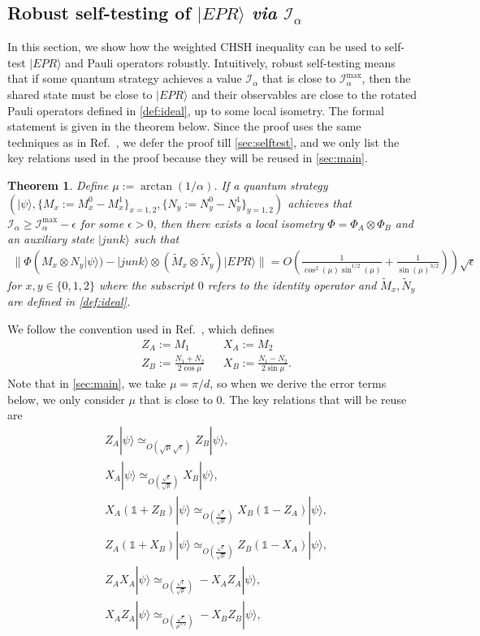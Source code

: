 \documentclass[11pt,letterpaper]{article}
\newcommand{\ket}[1]{|#1\rangle}
\newcommand{\x}{\otimes}
\newcommand{\1}{\mathbb{1}}
\newcommand{\tM}{\tilde{M}}
\newcommand{\tN}{\tilde{N}}
\newcommand{\I}{\mathcal{I}}
\newcommand{\se}{\sqrt{\epsilon}}
\newcommand{\appd}[1]{\simeq_{#1}}
\newtheorem{theorem}{Theorem}[section]
\theoremstyle{definition}
\begin{document}
\subsection{Robust self-testing of $\ket{EPR}$ \textit{via} $\I_\alpha$}
\label{sec:chsh}
In this section, we show how the weighted CHSH inequality can be used to self-test $\ket{EPR}$ and Pauli operators robustly.
Intuitively, robust self-testing means that if some quantum strategy achieves a value $\I_\alpha$ that is close to $\I_\alpha^{\max}$,
then the shared state must be close to $\ket{EPR}$ and their observables are close to the rotated Pauli operators 
defined in \cref{def:ideal},
up to some local isometry.
The formal statement is given in the theorem below. Since the proof uses the same techniques as in Ref.~\cite{bamps2015},
we defer the proof till \cref{sec:selftest}, and we only list the key relations used in the proof because they will be reused in \cref{sec:main}.
\begin{theorem}
\label{thm:selftest}
    Define $\mu := \arctan(1/\alpha)$.
	If a quantum strategy $(\ket{\psi}, \{M_x:=M_x^0-M_x^1\}_{x=1,2}, \{N_y :=N_y^0-N_y^1\}_{y = 1,2} )$ achieves that
	$\I_\alpha \geq \I_\alpha^{\max} - \epsilon$
	for some $\epsilon > 0$, then
	there exists a local isometry $\Phi = \Phi_A \x \Phi_B$ and an auxiliary state $\ket{junk}$  such that
	\begin{align*}
		\| \Phi( M_x \x N_y \ket{\psi}) -\ket{junk} \x (\tM_x \x \tN_y) \ket{EPR}  \| = O(\frac{1}{\cos^2(\mu)\sin^{1/2}(\mu)}+
		\frac{1}{\sin(\mu)^{3/2}})) \sqrt{\epsilon}
	\end{align*}
	for $x,y \in \{0, 1, 2\}$ where the subscript $0$ refers to the identity operator and $\tM_x, \tN_y$ are 
	defined in \cref{def:ideal}.  
\end{theorem}
We follow the convention used in Ref.~\cite{bamps2015},
which defines
\begin{align*}
	&Z_A := M_1 && X_A := M_2\\
	&Z_B := \frac{N_1+N_2}{2\cos{\mu}} && X_B := \frac{N_1-N_2}{2\sin{\mu}}.
\end{align*}
Note that in \cref{sec:main}, we take $\mu = \pi/d$, so
when we derive the error terms below, we only consider $\mu$ 
that is close to $0$.
The key relations that will be reuse are
\begin{align}
	\label{eq:za-zb}& Z_A\ket{\psi} \appd{O( \sqrt{\mu} \se)} Z_B\ket{\psi},\\
	\label{eq:xa-xb}&X_A\ket{\psi} \appd{O(\frac{\se}{\sqrt{\mu}})} X_B \ket{\psi}, \\
	\label{eq:xazb}&X_A(\1+Z_B)\ket{\psi} \appd{O(\frac{\se}{\sqrt{\mu}})} X_B(\1-Z_A) \ket{\psi},\\
	\label{eq:zaxb}&Z_A(\1+X_B)\ket{\psi} \appd{O(\frac{\se}{\sqrt{\mu}})} Z_B(\1-X_A) \ket{\psi},\\
	\label{eq:zaxa}&Z_AX_A\ket{\psi} \appd{O(\frac{\se}{\sqrt{\mu}})} -X_AZ_A \ket{\psi},\\
	\label{eq:zaxaxbzb}&X_AZ_A \ket{\psi} \appd{O(\frac{\se}{\mu^{3/2}})} -X_BZ_B \ket{\psi},
\end{align}
\end{document}
